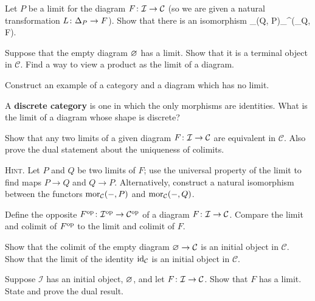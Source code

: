\bs
\ben[label=(\alph*)]
\item 
\item 
\item 
\een
\es

\bp
Let $P$ be a limit for the diagram $F \colon\mathcal{I} \to \mathcal{C}$ (so we are given a natural transformation $L \colon \Delta_P \to F$). Show that there is an isomorphism
\bse
\mor_{}(Q, P)\xrightarrow{\ \cong \ }\mor_{^{}}(\Delta_Q, F).
\ese
\ep

\bs
\es

\bx
Suppose that the empty diagram $\varnothing$ has a limit. Show that it is a terminal object in $\mathcal{C}$. Find a way to view a product as the limit of a diagram.
\ex

\bs
\es

\bx
\ben[label=(\alph*)]
\item Construct an example of a category and a diagram which has no limit.
\item A \textbf{discrete category} is one in which the only morphisms are identities. What is the limit of a diagram whose shape is discrete?
\een
\ex

\bs
\ben[label=(\alph*)]
\item  
\item 
\een
\es

\bp
Show that any two limits of a given diagram $F \colon \mathcal{I} \to \mathcal{C}$ are equivalent in $\mathcal{C}$. Also prove the dual statement about the uniqueness of colimits.

{\scshape Hint.} Let $P$ and $Q$ be two limits of $F$; use the universal property of the limit to find maps $P \to Q$ and $Q \to P$. Alternatively, construct a natural isomorphism between the functors $\operatorname{mor}_{\mathcal{C}}( - , P)$ and $\operatorname{mor}_{\mathcal{C}}( -,Q)$.
\ep

\bs
\es

\bx
Define the opposite $F^{\mathrm{op}} \colon \mathcal{I}^{\mathrm{op}} \to \mathcal{C}^{\mathrm{op}}$ of a diagram $F \colon\mathcal{I} \to\mathcal{C}$. Compare the limit and colimit of $F^{\mathrm{op}}$ to the limit and colimit of $F$.
\ex

\bs
\es

\bx
Show that the colimit of the empty diagram $\varnothing \to \mathcal{C}$ is an initial object in $\mathcal{C}$. Show that the limit of the identity $\mathrm{id}_\mathcal{C}$ is an initial object in $\mathcal{C}$.
\ex

\bs
\es

\bx
Suppose $\mathcal{I}$ has an initial object, $\varnothing$, and let $F \colon \mathcal{I} \to \mathcal{C}$. Show that $F$ has a limit. State and prove the dual result.
\ex

